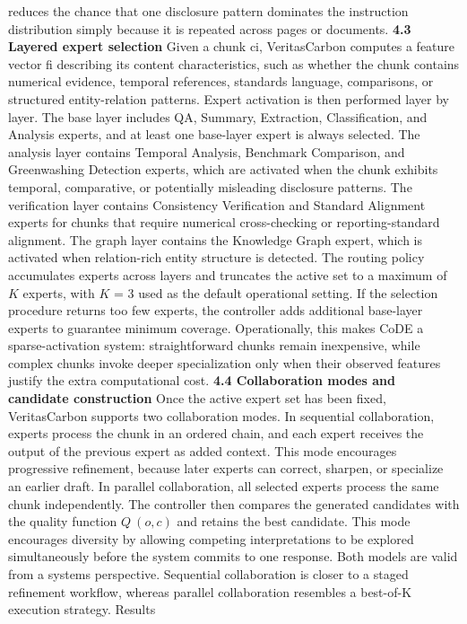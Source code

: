 \documentclass[9pt,twocolumn]{extarticle}
\begin{document}
reduces the chance that one disclosure pattern dominates the instruction
distribution simply because it is repeated across pages or documents.
\textbf{4.3 Layered expert selection}
Given a chunk ci, VeritasCarbon computes a feature vector fi describing
its content characteristics, such as whether the chunk contains
numerical evidence, temporal references, standards language,
comparisons, or structured entity-relation patterns. Expert activation
is then performed layer by layer. The base layer includes QA, Summary,
Extraction, Classification, and Analysis experts, and at least one
base-layer expert is always selected. The analysis layer contains
Temporal Analysis, Benchmark Comparison, and Greenwashing Detection
experts, which are activated when the chunk exhibits temporal,
comparative, or potentially misleading disclosure patterns. The
verification layer contains Consistency Verification and Standard
Alignment experts for chunks that require numerical cross-checking or
reporting-standard alignment. The graph layer contains the Knowledge
Graph expert, which is activated when relation-rich entity structure is
detected.
The routing policy accumulates experts across layers and truncates the
active set to a maximum of \(K\) experts, with \(K\) = 3 used as the
default operational setting. If the selection procedure returns too few
experts, the controller adds additional base-layer experts to guarantee
minimum coverage. Operationally, this makes CoDE a sparse-activation
system: straightforward chunks remain inexpensive, while complex chunks
invoke deeper specialization only when their observed features justify
the extra computational cost.
\textbf{4.4 Collaboration modes and candidate construction}
Once the active expert set has been fixed, VeritasCarbon supports two
collaboration modes. In sequential collaboration, experts process the
chunk in an ordered chain, and each expert receives the output of the
previous expert as added context. This mode encourages progressive
refinement, because later experts can correct, sharpen, or specialize an
earlier draft. In parallel collaboration, all selected experts process
the same chunk independently. The controller then compares the generated
candidates with the quality function \(Q\ (o,c)\) and retains the best
candidate. This mode encourages diversity by allowing competing
interpretations to be explored simultaneously before the system commits
to one response.
Both models are valid from a systems perspective. Sequential
collaboration is closer to a staged refinement workflow, whereas
parallel collaboration resembles a best-of-K execution strategy. Results
\end{document}
